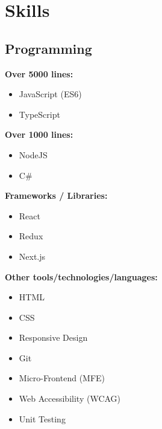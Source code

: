 \documentclass[letterpaper]{deedy-resume} %
\begin{document}
\begin{minipage}[t]{0.33\textwidth} %







\section{Skills}

\subsection{Programming}

\textbf{Over 5000 lines:}
\begin{itemize}
\setlength\itemsep{-0.5em} %
\item JavaScript (ES6)
\item TypeScript
\end{itemize}

\textbf{Over 1000 lines:}
\begin{itemize}
\setlength\itemsep{-0.5em} %
\item NodeJS
\item C\#
\end{itemize}

\textbf{Frameworks / Libraries:}
\begin{itemize}
\setlength\itemsep{-0.5em} %
\item React
\item Redux
\item Next.js
\end{itemize}


\textbf{Other tools/technologies/languages:}
\begin{itemize}
\setlength\itemsep{-0.5em} %
\item HTML
\item CSS
\item Responsive Design
\item Git
\item Micro-Frontend (MFE)
\item Web Accessibility (WCAG)
\item Unit Testing
\end{itemize}


\end{minipage}
\end{document}
